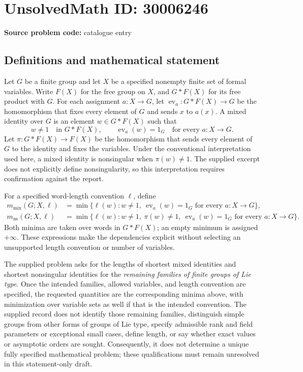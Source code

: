 \documentclass[11pt]{article}
\begin{document}
\section*{UnsolvedMath ID: 30006246}
\textbf{Source problem code:} catalogue entry
\subsection{Definitions and mathematical statement}
Let \(G\) be a finite group and let \(X\) be a specified nonempty finite set of formal variables. Write \(F(X)\) for the free group on \(X\), and \(G*F(X)\) for its free product with \(G\). For each assignment \(a:X\to G\), let \(\operatorname{ev}_a:G*F(X)\to G\) be the homomorphism that fixes every element of \(G\) and sends \(x\) to \(a(x)\). A mixed identity over \(G\) is an element \(w\in G*F(X)\) such that
\[
w\ne 1\quad\text{in }G*F(X),\qquad
\operatorname{ev}_a(w)=1_G\quad\text{for every }a:X\to G.
\]
Let \(\pi:G*F(X)\to F(X)\) be the homomorphism that sends every element of \(G\) to the identity and fixes the variables. Under the conventional interpretation used here, a mixed identity is nonsingular when \(\pi(w)\ne 1\). The supplied excerpt does not explicitly define nonsingularity, so this interpretation requires confirmation against the report.

For a specified word-length convention \(\ell\), define
\[
\begin{aligned}
m_{\mathrm{mix}}(G;X,\ell)
&=\min\{\ell(w):w\ne1,\ \operatorname{ev}_a(w)=1_G\text{ for every }a:X\to G\},\\
m_{\mathrm{ns}}(G;X,\ell)
&=\min\{\ell(w):w\ne1,\ \pi(w)\ne1,\ \operatorname{ev}_a(w)=1_G\text{ for every }a:X\to G\}.
\end{aligned}
\]
Both minima are taken over words in \(G*F(X)\); an empty minimum is assigned \(+\infty\). These expressions make the dependencies explicit without selecting an unsupported length convention or number of variables.

The supplied problem asks for the lengths of shortest mixed identities and shortest nonsingular identities for the \emph{remaining families of finite groups of Lie type}. Once the intended families, allowed variables, and length convention are specified, the requested quantities are the corresponding minima above, with minimization over variable sets as well if that is the intended convention. The supplied record does not identify those remaining families, distinguish simple groups from other forms of groups of Lie type, specify admissible rank and field parameters or exceptional small cases, define length, or say whether exact values or asymptotic orders are sought. Consequently, it does not determine a unique fully specified mathematical problem; these qualifications must remain unresolved in this statement-only draft.
\end{document}
